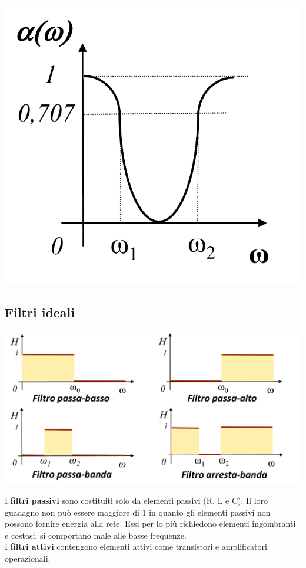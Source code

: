 \documentclass{article}
\begin{document}
\begin{center}
    \includegraphics[scale=0.27]{Image/Arresta-banda_2.png}
\end{center}


\subsection{Filtri ideali}
\begin{center}
    \includegraphics[scale=0.3]{Image/Filtri_ideali.png}
\end{center}
I \textbf{filtri passivi} sono costituiti solo da elementi passivi (R, L e C). Il loro guadagno non può essere maggiore di 1 in quanto gli elementi passivi non
possono fornire energia alla rete. Essi per lo più richiedono elementi ingombranti e costosi; si comportano male alle basse frequenze.\\
I \textbf{filtri attivi} contengono elementi attivi come transistori e amplificatori operazionali.
\end{document}
